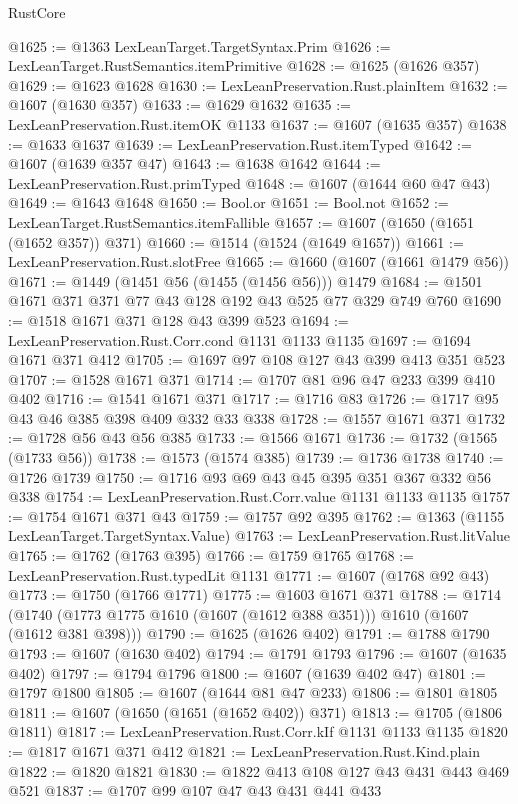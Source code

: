 \begin{lexlean}{RustCore}
\begin{coremodule}
@1625 := @1363 LexLeanTarget.TargetSyntax.Prim
@1626 := LexLeanTarget.RustSemantics.itemPrimitive
@1628 := @1625 (@1626 @357)
@1629 := @1623 @1628
@1630 := LexLeanPreservation.Rust.plainItem
@1632 := @1607 (@1630 @357)
@1633 := @1629 @1632
@1635 := LexLeanPreservation.Rust.itemOK @1133
@1637 := @1607 (@1635 @357)
@1638 := @1633 @1637
@1639 := LexLeanPreservation.Rust.itemTyped
@1642 := @1607 (@1639 @357 @47)
@1643 := @1638 @1642
@1644 := LexLeanPreservation.Rust.primTyped
@1648 := @1607 (@1644 @60 @47 @43)
@1649 := @1643 @1648
@1650 := Bool.or
@1651 := Bool.not
@1652 := LexLeanTarget.RustSemantics.itemFallible
@1657 := @1607 (@1650 (@1651 (@1652 @357)) @371)
@1660 := @1514 (@1524 (@1649 @1657))
@1661 := LexLeanPreservation.Rust.slotFree
@1665 := @1660 (@1607 (@1661 @1479 @56))
@1671 := @1449 (@1451 @56 (@1455 (@1456 @56))) @1479
@1684 := @1501 @1671 @371 @371 @77 @43 @128 @192 @43 @525 @77 @329 @749 @760
@1690 := @1518 @1671 @371 @128 @43 @399 @523
@1694 := LexLeanPreservation.Rust.Corr.cond @1131 @1133 @1135
@1697 := @1694 @1671 @371 @412
@1705 := @1697 @97 @108 @127 @43 @399 @413 @351 @523
@1707 := @1528 @1671 @371
@1714 := @1707 @81 @96 @47 @233 @399 @410 @402
@1716 := @1541 @1671 @371
@1717 := @1716 @83
@1726 := @1717 @95 @43 @46 @385 @398 @409 @332 @33 @338
@1728 := @1557 @1671 @371
@1732 := @1728 @56 @43 @56 @385
@1733 := @1566 @1671
@1736 := @1732 (@1565 (@1733 @56))
@1738 := @1573 (@1574 @385)
@1739 := @1736 @1738
@1740 := @1726 @1739
@1750 := @1716 @93 @69 @43 @45 @395 @351 @367 @332 @56 @338
@1754 := LexLeanPreservation.Rust.Corr.value @1131 @1133 @1135
@1757 := @1754 @1671 @371 @43
@1759 := @1757 @92 @395
@1762 := @1363 (@1155 LexLeanTarget.TargetSyntax.Value)
@1763 := LexLeanPreservation.Rust.litValue
@1765 := @1762 (@1763 @395)
@1766 := @1759 @1765
@1768 := LexLeanPreservation.Rust.typedLit @1131
@1771 := @1607 (@1768 @92 @43)
@1773 := @1750 (@1766 @1771)
@1775 := @1603 @1671 @371
@1788 := @1714 (@1740 (@1773 @1775 @1610 (@1607 (@1612 @388 @351))) @1610 (@1607 (@1612 @381 @398)))
@1790 := @1625 (@1626 @402)
@1791 := @1788 @1790
@1793 := @1607 (@1630 @402)
@1794 := @1791 @1793
@1796 := @1607 (@1635 @402)
@1797 := @1794 @1796
@1800 := @1607 (@1639 @402 @47)
@1801 := @1797 @1800
@1805 := @1607 (@1644 @81 @47 @233)
@1806 := @1801 @1805
@1811 := @1607 (@1650 (@1651 (@1652 @402)) @371)
@1813 := @1705 (@1806 @1811)
@1817 := LexLeanPreservation.Rust.Corr.kIf @1131 @1133 @1135
@1820 := @1817 @1671 @371 @412
@1821 := LexLeanPreservation.Rust.Kind.plain
@1822 := @1820 @1821
@1830 := @1822 @413 @108 @127 @43 @431 @443 @469 @521
@1837 := @1707 @99 @107 @47 @43 @431 @441 @433

\end{coremodule}
\end{lexlean}
